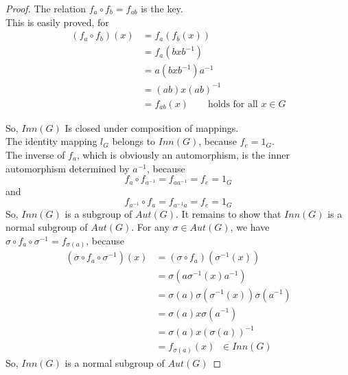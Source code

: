 \documentclass[../main-sheet.tex]{subfiles}
\begin{document}
\begin{proof}
    The relation \(f_a \circ f_b = f_{ab}\) is the key.\\
    This is easily proved, for
    \begin{align*}
        (f_a\circ f_b)(x)&=f_a(f_b(x))\\
        &=f_a(bxb^{-1})\\
        &=a(bxb^{-1})a^{-1}\\
        &=(ab)x(ab)^{-1}\\
        &=f_{ab}(x)\qquad \text{holds for all } x\in G
    \end{align*}
    
    So, \(Inn(G)\) Is closed under composition of mappings.\\
    The identity mapping \(l_G\) belongs to \(Inn(G)\), because \(f_e = 1_G\).\\
The inverse of \(f_a\), which is obviously an automorphism, is the inner automorphism
determined by \(a^{-1}\), because
\[f_a \circ  f_{a^{-1}}= f_{aa^{-1}}=f_e=1_G\]
and 
\[f_{a^{-1}} \circ  f_{a}= f_{a^{-1}a}=f_e=1_G\]
So, \(Inn(G)\) is a subgroup of \(Aut(G)\).
It remains to show that \(Inn(G)\) is a normal subgroup of \(Aut(G)\).
For any \(\sigma \in Aut(G)\), we have \(\sigma \circ f_a \circ \sigma^{-1}  = f_{\sigma(a)}\), because
\begin{align*}
    (\sigma \circ f_a \circ \sigma^{-1})(x)&=(\sigma \circ f_a)(\sigma^{-1}(x))\\
    &=\sigma(a\sigma^{-1}(x)a^{-1})\\
    &=\sigma(a)\sigma(\sigma^{-1}(x))\sigma(a^{-1})\\
    &=\sigma(a)x\sigma(a^{-1})\\
    &=\sigma(a)x(\sigma(a))^{-1}\\
    &=f_{\sigma (a)}(x)\;\;\in Inn(G)
\end{align*}
So, \(Inn(G)\) is a normal subgroup of \(Aut(G)\)
\end{proof}
\end{document}
